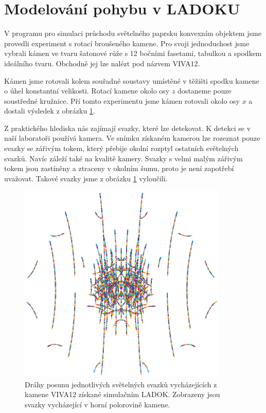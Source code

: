 \section*{Modelování pohybu v LADOKU}

V programu pro simulaci průchodu světelného paprsku konvexním objektem jsme provedli experiment s rotací broušeného kamene. Pro svoji jednoduchost jsme vybrali kámen ve tvaru šatonové růže s 12 bočními fasetami, tabulkou a spodkem ideálního tvaru. Obchodně jej lze nalézt pod názvem VIVA12.

Kámen jsme rotovali kolem souřadné soustavy umístěné v těžišti spodku kamene o úhel konstantní velikosti. Rotací kamene okolo osy $z$ dostaneme pouze soustředné kružnice. Pří tomto experimentu jsme kámen rotovali okolo osy $x$ a dostali výsledek z obrázku \ref{fig:relativni pohyb graf}.

Z praktického hlediska nás zajímají svazky, které lze detekovat. K detekci se v naší laboratoři používá kamera. Ve snímku získaném kamerou lze rozeznat pouze svazky se zářivým tokem, který přebije okolní rozptyl ostatních světelných svazků. Navíc záleží také na kvalitě kamery. Svazky s velmi malým zářivým tokem jsou zastíněny a ztraceny v okolním šumu, proto je není zapotřebí uvažovat. Takové svazky jsme z obrázku \ref{fig:relativni pohyb graf} vyloučili. 

\begin{figure}[h!]
\begin{center}
\includegraphics[width = 10cm]{figures/viva12_bigflux.eps}
\end{center}
\caption{Dráhy posunu jednotlivých světelných svazků vycházejících z kamene VIVA12 získané simulačním  LADOK. Zobrazeny jsou svazky vycházející v horní polorovině kamene. }

\label{fig:relativni pohyb graf}
\end{figure}

